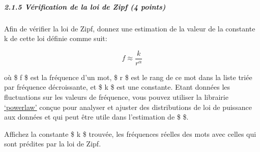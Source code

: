 \documentclass[11pt]{article}
\begin{document}
    \subparagraph{2.1.5 Vérification de la loi de Zipf (4
points)}\label{vuxe9rification-de-la-loi-de-zipf-4-points}

Afin de vérifier la loi de Zipf, donnez une estimation de la valeur de
la constante k de cette loi définie comme suit:

\[ f \approx \frac{k}{r^\alpha} \]

où \$ f \$ est la fréquence d'un mot, \$ r \$ est le rang de ce mot dans
la liste triée par fréquence décroissante, et \$ k \$ est une constante.
Etant données les fluctuations sur les valeurs de fréquence, vous pouvez
utiliser la librairie
\href{https://pypi.org/project/powerlaw/}{`powerlaw'} conçue pour
analyser et ajuster des distributions de loi de puissance aux données et
qui peut être utile dans l'estimation de \$ \alpha \$.

Affichez la constante \$ k \$ trouvée, les fréquences réelles des mots
avec celles qui sont prédites par la loi de Zipf.
\end{document}
